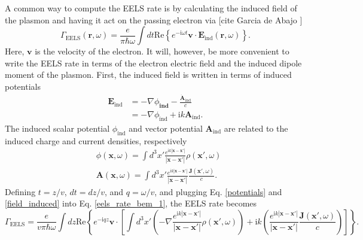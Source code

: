 \documentclass [11pt, proquest] {uwthesis}[2016/11/22]
\begin{document}
A common way to compute the EELS rate is by calculating the induced field of the plasmon and having it act on the passing electron via\cite{AbajoRevMod,Hohenester2014,Quillin} [cite Garcia de Abajo ]
\begin{equation}
\Gamma_{\textrm{EELS}}(\textbf{r},\omega) = \frac{e}{\pi\hbar\omega}\int dt \textrm{Re}\left\{ e^{-\textrm{i}\omega t} \textbf{v} \cdot \textbf{E}_{\textrm{ind}}(\textbf{r},\omega)\right\}.
\label{eels_rate_bem_1}
\end{equation}
Here, $\textbf{v}$ is the velocity of the electron. It will, however, be more convenient to write the EELS rate in terms of the electron electric field and the induced dipole moment of the plasmon. First, the induced field is written in terms of induced potentials
\begin{equation}
\begin{aligned}
\textbf{E}_{\textrm{ind}} &= -\nabla\phi_{\textbf{ind}} - \frac{\dot{\textbf{A}}_{\textrm{ind}}}{c}\\
&= -\nabla\phi_{\textrm{ind}} + \textrm{i}k\textbf{A}_{\textrm{ind}}.
\label{field_induced}
\end{aligned}
\end{equation}
The induced scalar potential $\phi_{\textrm{ind}}$ and vector potential $\textbf{A}_{\textrm{ind}}$ are related to the induced charge and current densities, respectively
\begin{equation}
\begin{aligned}
&\phi(\textbf{x},\omega) = \int d^3x' \frac{e^{\textrm{i}k|\textbf{x}-\textbf{x}'|}}{|\textbf{x}-\textbf{x}'|}\rho(\textbf{x}',\omega)\\
&\textbf{A}(\textbf{x},\omega) = \int d^3x' \frac{e^{\textrm{i}k|\textbf{x}-\textbf{x}'|}}{|\textbf{x}-\textbf{x}'|}\frac{\textbf{J}(\textbf{x}',\omega)}{c}.
\label{potentials}
\end{aligned}
\end{equation}
Defining $t = z/v$, $dt = dz/v$, and $q = \omega/v$, and plugging Eq. \ref{potentials} and \ref{field_induced} into Eq. \ref{eels_rate_bem_1}, the EELS rate becomes
\begin{equation}
\Gamma_{\textrm{EELS}} = \frac{e}{v\pi\hbar\omega}\int dz \textrm{Re}\left\{ e^{-\textrm{i}qz} \textbf{v} \cdot \left[\int d^3x' \left(-\nabla\frac{e^{\textrm{i}k|\textbf{x}-\textbf{x}'|}}{|\textbf{x}-\textbf{x}'|}\rho(\textbf{x}',\omega)\right) + \textrm{i}k\left(\frac{e^{\textrm{i}k|\textbf{x}-\textbf{x}'|}}{|\textbf{x}-\textbf{x}'|}\frac{\textbf{J}(\textbf{x}',\omega)}{c}\right)\right]\right\}.
\label{eels_with_potentials}
\end{equation}
\end{document}
